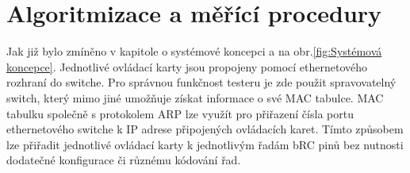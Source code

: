 


\chapter{Algoritmizace a měřící procedury}
Jak již bylo zmíněno v kapitole o systémové koncepci a na obr.\ref{fig:Systémová koncepce}.
Jednotlivé ovládací karty jsou propojeny pomocí ethernetového rozhraní do switche.
Pro správnou funkčnost testeru je zde použit spravovatelný switch, který mimo jiné umožňuje
získat informace o své MAC tabulce. MAC tabulku společně s protokolem ARP lze využít pro
přiřazení čísla portu ethernetového switche k IP adrese připojených ovládacích karet. Tímto způsobem
lze přiřadit jednotlivé ovládací karty k jednotlivým řadám bRC pinů bez nutnosti dodatečné konfigurace
či různému kódování řad.\par

